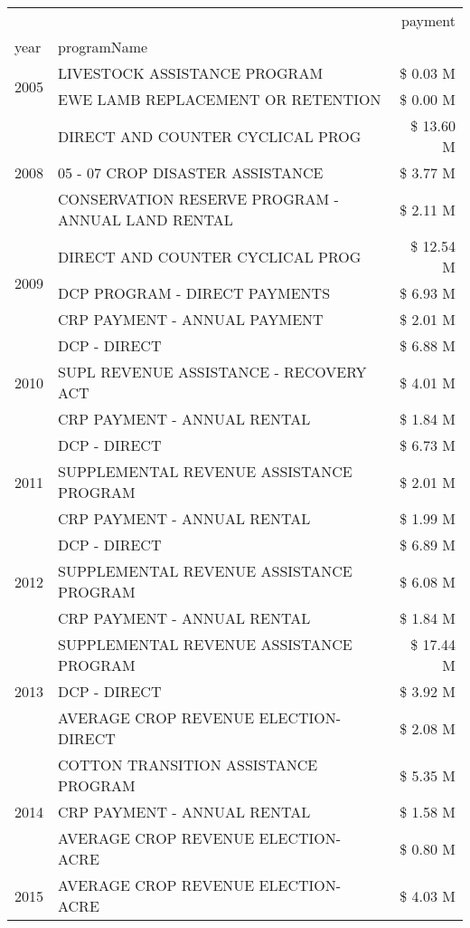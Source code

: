 \begin{tabular}{llr}
\toprule
 &  & payment \\
year & programName &  \\
\midrule
\multirow[t]{2}{*}{2005} & LIVESTOCK ASSISTANCE PROGRAM & \$ 0.03 M \\
 & EWE LAMB REPLACEMENT OR RETENTION & \$ 0.00 M \\
\cline{1-3}
\multirow[t]{3}{*}{2008} & DIRECT AND COUNTER CYCLICAL PROG & \$ 13.60 M \\
 & 05 - 07 CROP DISASTER ASSISTANCE & \$ 3.77 M \\
 & CONSERVATION RESERVE PROGRAM - ANNUAL LAND RENTAL & \$ 2.11 M \\
\cline{1-3}
\multirow[t]{3}{*}{2009} & DIRECT AND COUNTER CYCLICAL PROG & \$ 12.54 M \\
 & DCP PROGRAM - DIRECT PAYMENTS & \$ 6.93 M \\
 & CRP PAYMENT - ANNUAL PAYMENT & \$ 2.01 M \\
\cline{1-3}
\multirow[t]{3}{*}{2010} & DCP - DIRECT & \$ 6.88 M \\
 & SUPL REVENUE ASSISTANCE - RECOVERY ACT & \$ 4.01 M \\
 & CRP PAYMENT - ANNUAL RENTAL & \$ 1.84 M \\
\cline{1-3}
\multirow[t]{3}{*}{2011} & DCP - DIRECT & \$ 6.73 M \\
 & SUPPLEMENTAL REVENUE ASSISTANCE PROGRAM & \$ 2.01 M \\
 & CRP PAYMENT - ANNUAL RENTAL & \$ 1.99 M \\
\cline{1-3}
\multirow[t]{3}{*}{2012} & DCP - DIRECT & \$ 6.89 M \\
 & SUPPLEMENTAL REVENUE ASSISTANCE PROGRAM & \$ 6.08 M \\
 & CRP PAYMENT - ANNUAL RENTAL & \$ 1.84 M \\
\cline{1-3}
\multirow[t]{3}{*}{2013} & SUPPLEMENTAL REVENUE ASSISTANCE PROGRAM & \$ 17.44 M \\
 & DCP - DIRECT & \$ 3.92 M \\
 & AVERAGE CROP REVENUE ELECTION-DIRECT & \$ 2.08 M \\
\cline{1-3}
\multirow[t]{3}{*}{2014} & COTTON TRANSITION ASSISTANCE PROGRAM & \$ 5.35 M \\
 & CRP PAYMENT - ANNUAL RENTAL & \$ 1.58 M \\
 & AVERAGE CROP REVENUE ELECTION-ACRE & \$ 0.80 M \\
\cline{1-3}
\multirow[t]{3}{*}{2015} & AVERAGE CROP REVENUE ELECTION-ACRE & \$ 4.03 M \\

\end{tabular}
